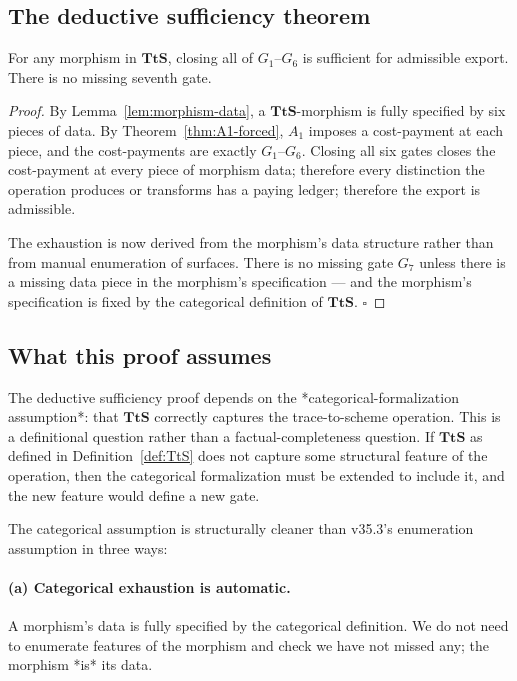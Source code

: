 \subsection{The deductive sufficiency theorem}
\label{subsec:deductive-sufficiency}

\begin{theorem}
\label{thm:deductive-sufficiency}
For any morphism in $\mathbf{TtS}$, closing all of $G_1$--$G_6$ is sufficient for admissible export. There is no missing seventh gate.
\end{theorem}

\begin{proof}
By Lemma~\ref{lem:morphism-data}, a $\mathbf{TtS}$-morphism is fully specified by six pieces of data. By Theorem~\ref{thm:A1-forced}, $A_1$ imposes a cost-payment at each piece, and the cost-payments are exactly $G_1$--$G_6$. Closing all six gates closes the cost-payment at every piece of morphism data; therefore every distinction the operation produces or transforms has a paying ledger; therefore the export is admissible.

The exhaustion is now derived from the morphism's data structure rather than from manual enumeration of surfaces. There is no missing gate $G_7$ unless there is a missing data piece in the morphism's specification — and the morphism's specification is fixed by the categorical definition of $\mathbf{TtS}$. $\square$
\end{proof}

\subsection{What this proof assumes}
\label{subsec:categorical-assumption}

The deductive sufficiency proof depends on the *categorical-formalization assumption*: that $\mathbf{TtS}$ correctly captures the trace-to-scheme operation. This is a definitional question rather than a factual-completeness question. If $\mathbf{TtS}$ as defined in Definition~\ref{def:TtS} does not capture some structural feature of the operation, then the categorical formalization must be extended to include it, and the new feature would define a new gate.

The categorical assumption is structurally cleaner than v35.3's enumeration assumption in three ways:

\paragraph{(a) Categorical exhaustion is automatic.} A morphism's data is fully specified by the categorical definition. We do not need to enumerate features of the morphism and check we have not missed any; the morphism *is* its data.

